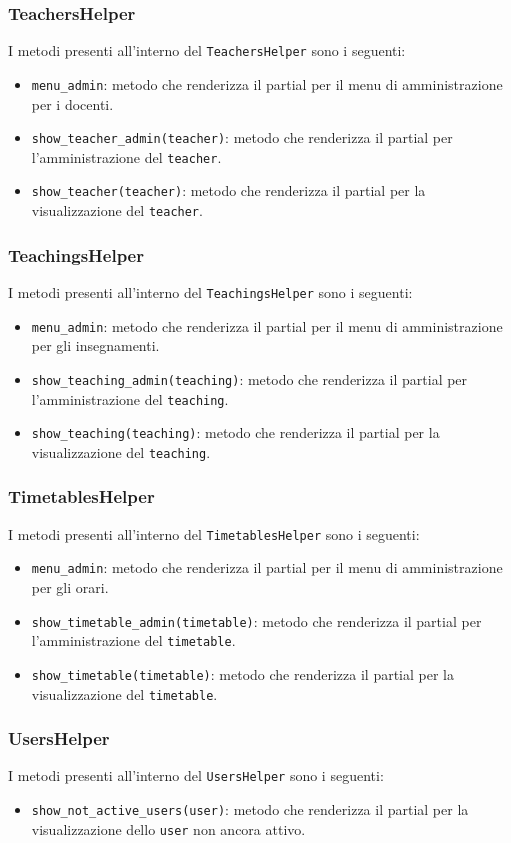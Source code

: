 \documentclass[11pt,a4paper]{article}
\begin{document}
\subsubsection{TeachersHelper}
I metodi presenti all'interno del \verb|TeachersHelper| sono i seguenti:
\begin{itemize}
 \item \verb|menu_admin|: metodo che renderizza il partial per il menu di amministrazione per i docenti.
 \item \verb|show_teacher_admin(teacher)|: metodo che renderizza il partial per l'amministrazione del \verb|teacher|.
 \item \verb|show_teacher(teacher)|: metodo che renderizza il partial per la visualizzazione del \verb|teacher|.
\end{itemize}
\subsubsection{TeachingsHelper}
I metodi presenti all'interno del \verb|TeachingsHelper| sono i seguenti:
\begin{itemize}
 \item \verb|menu_admin|: metodo che renderizza il partial per il menu di amministrazione per gli insegnamenti.
 \item \verb|show_teaching_admin(teaching)|: metodo che renderizza il partial per l'amministrazione del \verb|teaching|.
 \item \verb|show_teaching(teaching)|: metodo che renderizza il partial per la visualizzazione del \verb|teaching|.
\end{itemize}
\subsubsection{TimetablesHelper}
I metodi presenti all'interno del \verb|TimetablesHelper| sono i seguenti:
\begin{itemize}
 \item \verb|menu_admin|: metodo che renderizza il partial per il menu di amministrazione per gli orari.
 \item \verb|show_timetable_admin(timetable)|: metodo che renderizza il partial per l'amministrazione del \verb|timetable|.
 \item \verb|show_timetable(timetable)|: metodo che renderizza il partial per la visualizzazione del \verb|timetable|.
\end{itemize}
\subsubsection{UsersHelper}
I metodi presenti all'interno del \verb|UsersHelper| sono i seguenti:
\begin{itemize}
 \item \verb|show_not_active_users(user)|: metodo che renderizza il partial per la visualizzazione dello \verb|user| non ancora attivo.
\end{itemize}
\end{document}
